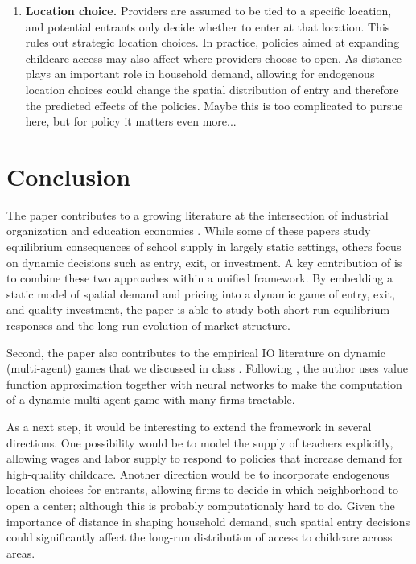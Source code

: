 \documentclass{article}
\begin{document}
\begin{enumerate}
\item \textbf{Location choice.}  
Providers are assumed to be tied to a specific location, and potential entrants only decide whether to enter at that location. This rules out strategic location choices. In practice, policies aimed at expanding childcare access may also affect where providers choose to open. As distance plays an important role in household demand, allowing for endogenous location choices could change the spatial distribution of entry and therefore the predicted effects of the policies. Maybe this is too complicated to pursue here, but for policy it matters even more...

\end{enumerate}


\section{Conclusion}

The paper contributes to a growing literature at the intersection of industrial organization and education economics \citep{allende2019, neilson2013, singleton2019, neilson_dinerstein_otero2020}. While some of these papers study equilibrium consequences of school supply in largely static settings, others focus on dynamic decisions such as entry, exit, or investment. A key contribution of \citet{bodere2023dynamic} is to combine these two approaches within a unified framework. By embedding a static model of spatial demand and pricing into a dynamic game of entry, exit, and quality investment, the paper is able to study both short-run equilibrium responses and the long-run evolution of market structure.

Second, the paper also contributes to the empirical IO literature on dynamic (multi-agent) games that we discussed in class \citep{ryan2012, collardwexler2013}. Following \citet{sweeting2013}, the author uses value function approximation together with neural networks to make the computation of a dynamic multi-agent game with many firms tractable.

As a next step, it would be interesting to extend the framework in several directions. One possibility would be to model the supply of teachers explicitly, allowing wages and labor supply to respond to policies that increase demand for high-quality childcare. Another direction would be to incorporate endogenous location choices for entrants, allowing firms to decide in which neighborhood to open a center; although this is probably computationaly hard to do. Given the importance of distance in shaping household demand, such spatial entry decisions could significantly affect the long-run distribution of access to childcare across areas.



\end{document}
